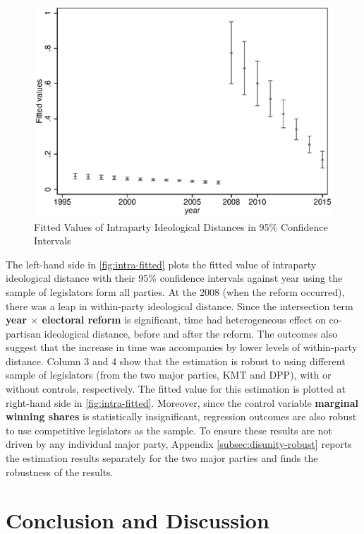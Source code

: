 \begin{figure}[ht]
\caption{Fitted Values of Intraparty Ideological Distances in 95\% Confidence Intervals \label{fig:intra-fitted}}
\centering{}\includegraphics[scale=0.59]{02-Chapter-Two/image/KD_intra}
\end{figure}

The left-hand side in \autoref{fig:intra-fitted} plots the fitted value of intraparty ideological distance with their 95\% confidence intervals against year using the sample of legislators form all parties. At the 2008 (when the reform occurred), there was a leap in within-party ideological distance. Since the intersection term \textbf{year $\times$ electoral reform }is significant, time had heterogeneous effect on co-partisan ideological distance, before and after the reform. The outcomes also suggest that the increase in time was accompanies by lower levels of within-party distance. Column 3 and 4 show that the estimation is robust to using different sample of legislators (from the two major parties, KMT and DPP), with or without controls, respectively. The fitted value for this estimation is plotted at right-hand side in \autoref{fig:intra-fitted}. Moreover, since the control variable \textbf{marginal winning shares }is statistically insignificant, regression outcomes are also robust to use competitive legislators as the sample. To ensure these results are not driven by any individual major party, Appendix \ref{subsec:disunity-robust} reports the estimation results separately for the two major parties and finds the robustness of the results.

\section*{\centering Conclusion and Discussion}

